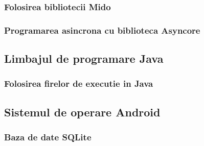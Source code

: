 \documentclass[../IoMusT.tex]{subfiles}
\begin{document}
\subsubsection{Folosirea bibliotecii Mido}
\subsubsection{Programarea asincrona cu biblioteca Asyncore}

\subsection{Limbajul de programare Java}
\subsubsection{Folosirea firelor de executie in Java}

\subsection{Sistemul de operare Android}
\subsubsection{Baza de date SQLite}
\end{document}
